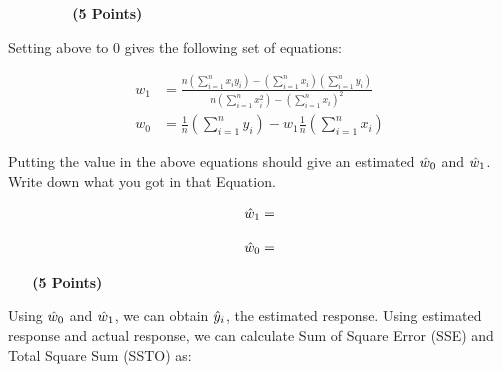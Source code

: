 \documentclass[12pt, xcolor=dvipsnames,svgnames,x11names]{article}
\begin{document}
\newpage

\begin{figure}[h]
\textbf{~~~(5 Points)}

\end{figure}



Setting above to 0 gives the following set of equations:

\begin{equation}
    \begin{aligned}
        w_1 & = \frac{n(\sum_{i=1}^{n} x_i y_i) - (\sum_{i=1}^{n} x_i)(\sum_{i=1}^{n} y_i)}{n(\sum_{i=1}^{n} x_i^2) - (\sum_{i=1}^{n} x_i)^2}
        \\
        w_0 & = \frac{1}{n}(\sum_{i=1}^{n} y_i) - w_1 \frac{1}{n}(\sum_{i=1}^{n} x_i)
    \end{aligned}
\end{equation}

Putting the value in the above equations should give an estimated ${\hat w}_0$ and ${\hat w}_1$. Write down what you got in that Equation.


\begin{equation}
    \begin{aligned}
       {\hat w}_1 = 
    \end{aligned}
\end{equation}

\vspace{100pt}

\begin{equation}
    \begin{aligned}
       {\hat w}_0 = 
    \end{aligned}
\end{equation}


\vspace{100pt}
\textbf{~~~(5 Points)}


Using ${\hat w}_0$ and ${\hat w}_1$, we can obtain ${\hat y}_i$, the estimated response. Using estimated response and actual response, we can calculate Sum of Square Error (SSE) and Total Square Sum (SSTO) as:
\end{document}
